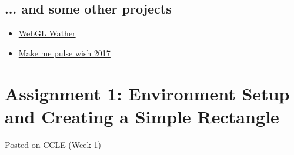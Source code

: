\documentclass[11pt]{article}
\providecommand{\tightlist}{%
      \setlength{\itemsep}{0pt}\setlength{\parskip}{0pt}}
\begin{document}
    \subsection{... and some other projects}\label{and-some-other-projects}

\begin{itemize}
\tightlist
\item
  \href{http://madebyevan.com/webgl-water/}{WebGL Wather}
\item
  \href{http://2017.makemepulse.com}{Make me pulse wish 2017}
\end{itemize}

    \section{Assignment 1: Environment Setup and Creating a Simple
Rectangle}\label{assignment-1-environment-setup-and-creating-a-simple-rectangle}

Posted on CCLE (Week 1)


    
    
    
    
\end{document}
